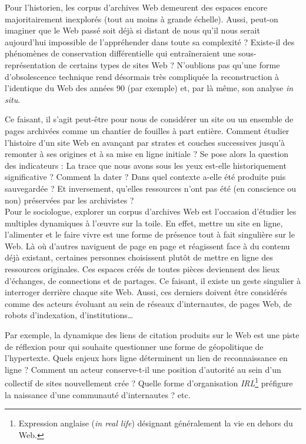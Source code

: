 \documentclass[symmetric,justified,marginals=raggedouter]{tufte-book}
\begin{document}
\noindent Pour l'historien, les corpus d'archives Web demeurent des espaces encore majoritairement inexplorés (tout au moins à grande échelle). Aussi, peut-on imaginer que le Web passé soit déjà si distant de nous qu'il nous serait aujourd'hui impossible de l'appréhender dans toute sa complexité ? Existe-il des phénomènes de conservation différentielle qui entraîneraient une sous-représentation de certains types de sites Web ? N'oublions pas qu'une forme d'obsolescence technique rend désormais très compliquée la reconstruction à l'identique du Web des années 90 (par exemple) et, par là même, son analyse \textit{in situ}. 

Ce faisant, il s'agit peut-être pour nous de considérer un site ou un ensemble de pages archivées comme un chantier de fouilles à part entière. Comment étudier l'histoire d'un site Web en avançant par strates et couches successives jusqu'à remonter à ses origines et à sa mise en ligne initiale ? Se pose alors la question des indicateurs : La trace que nous avons sous les yeux est-elle historiquement significative ? Comment la dater ? Dans quel contexte a-elle été produite puis sauvegardée ? Et inversement, qu'elles ressources n'ont pas été (en conscience ou non) préservées par les archivistes ?\\  

\noindent Pour le sociologue, explorer un corpus d'archives Web est l'occasion d'étudier les multiples dynamiques à l'œuvre sur la toile. En effet, mettre un site en ligne, l'alimenter et le faire vivre est une forme de présence tout à fait singulière sur le Web. Là où d'autres naviguent de page en page et réagissent face à du contenu déjà existant, certaines personnes choisissent plutôt de mettre en ligne des ressources originales. Ces espaces créés de toutes pièces deviennent des lieux d'échanges, de connections et de partages. Ce faisant, il existe un geste singulier à interroger derrière chaque site Web. Aussi, ces derniers doivent être considérés comme des acteurs évoluant au sein de réseaux d'internautes, de pages Web, de robots d'indexation, d'institutions\ldots{} 

Par exemple, la dynamique des liens de citation produits sur le Web est une piste de réflexion pour qui souhaite questionner une forme de géopolitique de l'hypertexte. Quels enjeux hors ligne déterminent un lien de reconnaissance en ligne ? Comment un acteur conserve-t-il une position d'autorité au sein d'un collectif de sites nouvellement crée ? Quelle forme d'organisation \textit{IRL}\footnote{Expression anglaise (\textit{in real life}) désignant généralement la vie en dehors du Web.} préfigure la naissance d'une communauté d'internautes ? etc. 
\end{document}
